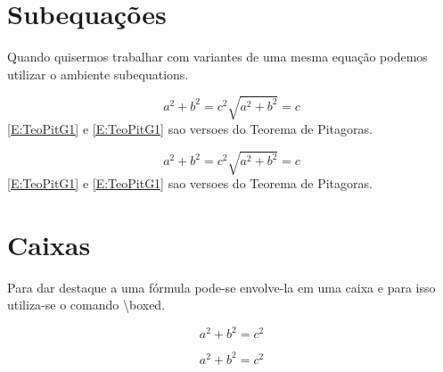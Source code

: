 \section{Subequações}
Quando quisermos trabalhar com variantes de uma mesma equação podemos utilizar o ambiente \textsf{subequations}. \\
\begin{minipage}[t]{0.47\linewidth} \vspace{-8pt}
    \begin{latexcode}
        \begin{subequations}\label{E:TeoPitG}
            \begin{equation}\label{E:TeoPitG1}
                a^2 + b^2 = c^2
            \end{equation}
            \begin{equation}\label{E:TeoPitG2}
                \sqrt{a^2 + b^2} = c
            \end{equation}
        \end{subequations}
        \ref{E:TeoPitG1} e \ref{E:TeoPitG1} sao versoes do Teorema de Pitagoras.
    \end{latexcode}
\end{minipage} \hfill
\begin{minipage}[t]{0.47\linewidth}\vspace{0pt}
    \begin{subequations}\label{E:TeoPitG}
        \begin{equation}\label{E:TeoPitG1}
            a^2 + b^2 = c^2
        \end{equation}
        \begin{equation}\label{E:TeoPitG2}
            \sqrt{a^2 + b^2} = c
        \end{equation}
    \end{subequations}
    \ref{E:TeoPitG1} e \ref{E:TeoPitG1} sao versoes do Teorema de Pitagoras.
\end{minipage}

\section{Caixas}
Para dar destaque a uma fórmula pode-se envolve-la em uma caixa e para isso utiliza-se o comando \textbackslash\textsf{boxed}. \\
\begin{minipage}[t]{0.47\linewidth} \vspace{-8pt}
    \begin{latexcode}
        $$ \boxed{a^2 + b^2 = c^2} $$
    \end{latexcode}
\end{minipage} \hfill
\begin{minipage}[t]{0.47\linewidth}
    \vspace{0pt}
    $$ \boxed{a^2 + b^2 = c^2} $$
\end{minipage}

